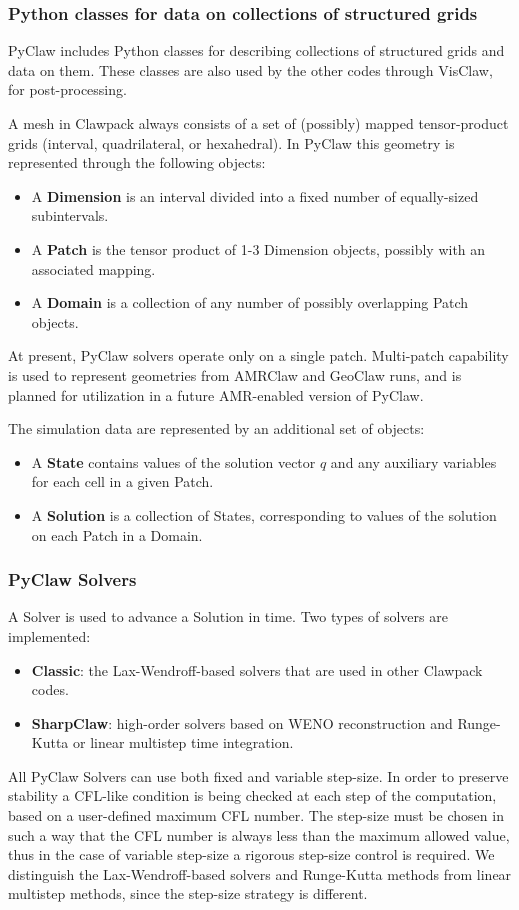 \subsubsection{Python classes for data on collections of structured grids}
PyClaw includes Python classes for describing collections of structured grids
and data on them.
These classes are also used by the other codes through VisClaw, for post-processing.

A mesh in Clawpack always consists of a set of (possibly) mapped tensor-product
grids (interval, quadrilateral, or hexahedral).  In PyClaw this geometry is represented
through the following objects:
\begin{itemize}
    \item A {\bf Dimension} is an interval divided into a fixed number of equally-sized subintervals.
    \item A {\bf Patch} is the tensor product of 1-3 Dimension objects, possibly with an associated mapping.
    \item A {\bf Domain} is a collection of any number of possibly overlapping Patch objects.
\end{itemize}
At present, PyClaw solvers operate only on a single patch.  Multi-patch capability
is used to represent geometries from AMRClaw and GeoClaw runs, and is planned for
utilization in a future AMR-enabled version of PyClaw.

The simulation data are represented by an additional set of objects:
\begin{itemize}
    \item A {\bf State} contains values of the solution vector $q$ and any
        auxiliary variables for each cell in a given Patch.
    \item A {\bf Solution} is a collection of States, corresponding to values of the solution
        on each Patch in a Domain.
\end{itemize}

\subsubsection{PyClaw Solvers}
A Solver is used to advance a Solution in time.  Two types of solvers are implemented:
\begin{itemize}
    \item {\bf Classic}: the Lax-Wendroff-based solvers that are used in other Clawpack codes.
    \item {\bf SharpClaw}: high-order solvers based on WENO reconstruction and Runge-Kutta
        or linear multistep time integration.
\end{itemize}
All PyClaw Solvers can use both fixed and variable step-size.
In order to preserve stability a CFL-like condition is being checked at each step of the computation, based on
a user-defined maximum CFL number.
The step-size must be chosen in such a way that the CFL number is always less than the maximum allowed 
value, thus in the case of variable step-size a rigorous step-size control is required.
We distinguish the Lax-Wendroff-based solvers and Runge-Kutta methods from linear multistep methods,
since the step-size strategy is different.

